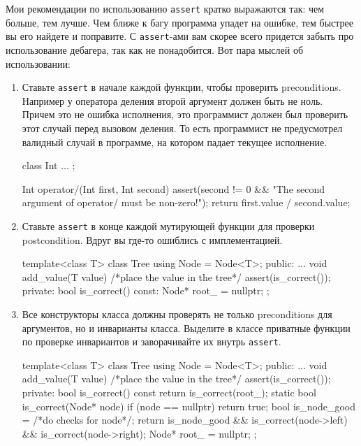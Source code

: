 Мои рекомендации по использованию \verb"assert" кратко выражаются так: чем больше, тем лучше.
Чем ближе к багу программа упадет на ошибке, тем быстрее вы его найдете и поправите.
С \verb"assert"-ами вам скорее всего придется забыть про использование дебагера, так как не понадобится.
Вот пара мыслей об использовании:
\begin{enumerate}
\item  Ставьте \verb"assert" в начале каждой функции, чтобы проверить preconditions.
Например у оператора деления второй аргумент должен быть не ноль.
Причем это не ошибка исполнения, это программист должен был проверить этот случай перед вызовом деления.
То есть программист не предусмотрел валидный случай в программе, на котором падает текущее исполнение.
\begin{cppcode}
class Int {
  ...
};

Int operator/(Int first, Int second) {
  assert(second != 0 && "The second argument of operator/ must be non-zero!");
    return first.value / second.value;
}
\end{cppcode}

\item Ставьте \verb"assert" в конце каждой мутирующей функции для проверки postcondition.
Вдруг вы где-то ошиблись с имплементацией.
\begin{cppcode}
template<class T>
class Tree {
  using Node = Node<T>;
public:
  ...
  void add_value(T value) {
    /*place the value in the tree*/
    assert(is_correct());
  }
private:
  bool is_correct() const:
  Node* root_ = nullptr;
};
\end{cppcode}

\item Все конструкторы класса должны проверять не только preconditions для аргументов, но и инварианты класса.
Выделите в классе приватные функции по проверке инвариантов и заворачивайте их внутрь \verb"assert".
\begin{cppcode}
template<class T>
class Tree {
  using Node = Node<T>;
public:
  ...
  void add_value(T value) {
    /*place the value in the tree*/
    assert(is_correct());
  }
private:
  bool is_correct() const {
    return is_correct(root_);  
  }
  static bool is_correct(Node* node) {
    if (node == nullptr)
      return true;
    bool is_node_good = /*do checks for node*/;    
    return is_node_good && is_correct(node->left) && is_correct(node->right);
  }
  Node* root_ = nullptr;
};
\end{cppcode}


\end{enumerate}
